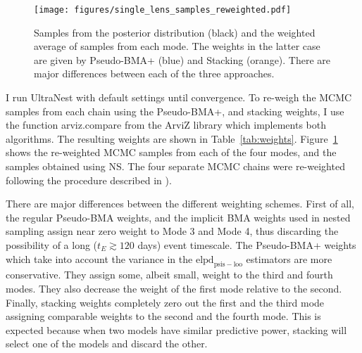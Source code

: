 \documentclass[12pt,dvipsnames]{report}
\newcommand{\ssf}[1]{\textsf{#1}}
\begin{document}
\begin{figure}[t]
    \begin{centering}
        \texttt{[image: figures/single\_lens\_samples\_reweighted.pdf]}
        \caption{
            Samples from the posterior distribution (black) and the weighted average 
            of samples from each mode. The weights in the latter case are given 
            by Pseudo-BMA+ (blue) and Stacking (orange). There are major differences 
            between each of the three approaches.
        }
            \label{fig:ogle_lightcurve_fit_samples_reweighted}
    \end{centering}
\end{figure}

I run \ssf{UltraNest} with default settings until convergence. 
To re-weigh the MCMC samples from each chain using the Pseudo-BMA+, and stacking 
weights, I use the function \ssf{arviz.compare} from the \ssf{ArviZ} library which 
implements both algorithms. The resulting weights are shown in Table~\ref{tab:weights}.
Figure~\ref{fig:ogle_lightcurve_fit_samples_reweighted} shows the re-weighted MCMC
samples from each of the four modes, and the samples obtained using NS. The four 
separate MCMC chains were re-weighted following the procedure described in 
\citet{arXiv:2006.12335}).

There are major differences between the different weighting schemes.
First of all, the regular Pseudo-BMA weights, and the implicit 
BMA weights used in nested sampling assign near zero weight to Mode 3 and Mode 4, 
thus discarding the possibility of a long ($t_E\gtrsim 120$ days) event 
timescale. The Pseudo-BMA+ weights which take into account 
the variance in the $\mathrm{elpd}_\mathrm{psis-loo}$ estimators are more conservative. 
They assign some, albeit small, weight to the third and fourth modes. They also 
decrease the weight of the first mode relative to the second.
Finally, stacking weights completely zero out the first and the third mode assigning 
comparable weights to the second and the fourth mode.
This is expected because when two models have similar predictive power, stacking 
will select one of the models and discard the other. 
\end{document}
